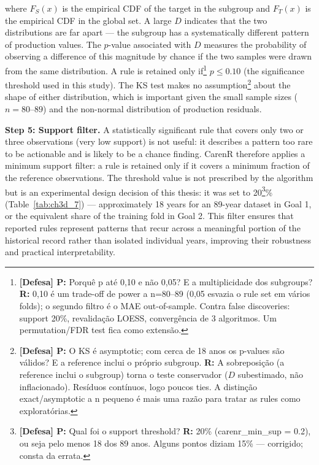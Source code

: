 where $F_S(x)$ is the empirical CDF of the target in the subgroup and $F_T(x)$ is the empirical CDF in the global set. A large $D$ indicates that the two distributions are far apart --- the subgroup has a systematically different pattern of production values. The $p$-value associated with $D$ measures the probability of observing a difference of this magnitude by chance if the two samples were drawn from the same distribution. A rule is retained only if\footnote{\textbf{[Defesa] P:} Porquê p até 0,10 e não 0,05? E a multiplicidade dos subgroups? \textbf{R:} 0,10 é um trade-off de power a n=80--89 (0,05 esvazia o rule set em vários folds); o segundo filtro é o MAE out-of-sample. Contra false discoveries: support 20\%, revalidação LOESS, convergência de 3 algoritmos. Um permutation/FDR test fica como extensão.} $p \leq 0.10$ (the significance threshold used in this study). The KS test makes no assumption\footnote{\textbf{[Defesa] P:} O KS é asymptotic; com cerca de 18 anos os p-values são válidos? E a reference inclui o próprio subgroup. \textbf{R:} A sobreposição (a reference inclui o subgroup) torna o teste conservador ($D$ subestimado, não inflacionado). Resíduos contínuos, logo poucos ties. A distinção exact/asymptotic a n pequeno é mais uma razão para tratar as rules como exploratórias.} about the shape of either distribution, which is important given the small sample sizes ($n = 80$--$89$) and the non-normal distribution of production residuals.

\textbf{Step 5: Support filter. }A statistically significant rule that covers only two or three observations (very low support) is not useful: it describes a pattern too rare to be actionable and is likely to be a chance finding. CarenR therefore applies a minimum support filter: a rule is retained only if it covers a minimum fraction of the reference observations. The threshold value is not prescribed by the algorithm but is an experimental design decision of this thesis: it was set to 20\footnote{\textbf{[Defesa] P:} Qual foi o support threshold? \textbf{R:} 20\% (carenr\_min\_sup = 0.2), ou seja pelo menos 18 dos 89 anos. Alguns pontos diziam 15\% --- corrigido; consta da errata.}\% (Table~\ref{tab:ch3d_7}) --- approximately 18 years for an 89-year dataset in Goal 1, or the equivalent share of the training fold in Goal 2. This filter ensures that reported rules represent patterns that recur across a meaningful portion of the historical record rather than isolated individual years, improving their robustness and practical interpretability.

